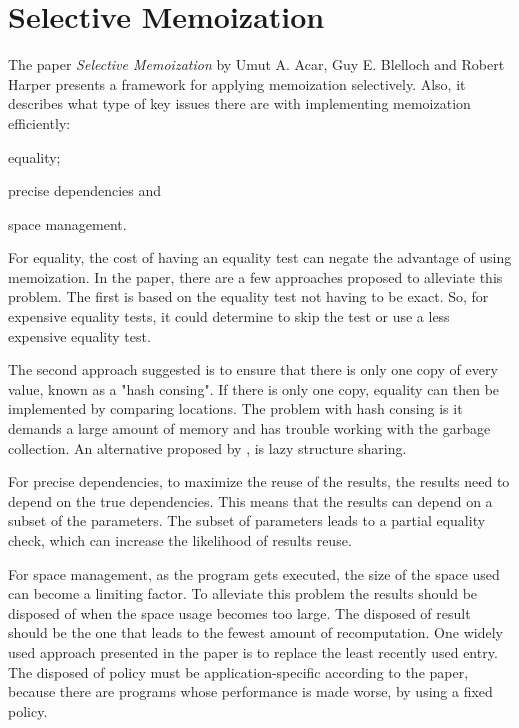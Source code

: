 \section{Selective Memoization}
\label{sec-select-mem}

The paper \textit{Selective Memoization} by Umut A. Acar, Guy E. Blelloch and Robert Harper\cite{acar2003selective} presents a framework for applying memoization selectively. Also, it describes what type of key issues there are with implementing memoization efficiently:
\begin{enumerate*}[label={(\alph*)}]
    \item equality; 
    \item precise dependencies and 
    \item space management.
\end{enumerate*}

For equality, the cost of having an equality test can negate the advantage of using memoization. In the paper, there are a few approaches proposed to alleviate this problem. The first is based on the equality test not having to be exact. So, for expensive equality tests, it could determine to skip the test or use a less expensive equality test. 

The second approach suggested is to ensure that there is only one copy of every value, known as a "hash consing". If there is only one copy, equality can then be implemented by comparing locations. The problem with hash consing is it demands a large amount of memory and has trouble working with the garbage collection. An alternative proposed by \cite{pugh1989incremental}, is lazy structure sharing.

For precise dependencies, to maximize the reuse of the results, the results need to depend on the true dependencies. This means that the results can depend on a subset of the parameters. The subset of parameters leads to a partial equality check, which can increase the likelihood of results reuse. 

For space management, as the program gets executed, the size of the space used can become a limiting factor. To alleviate this problem the results should be disposed of when the space usage becomes too large. The disposed of result should be the one that leads to the fewest amount of recomputation. One widely used approach presented in the paper is to replace the least recently used entry. The disposed of policy must be application-specific according to the paper, because there are programs whose performance is made worse, by using a fixed policy.